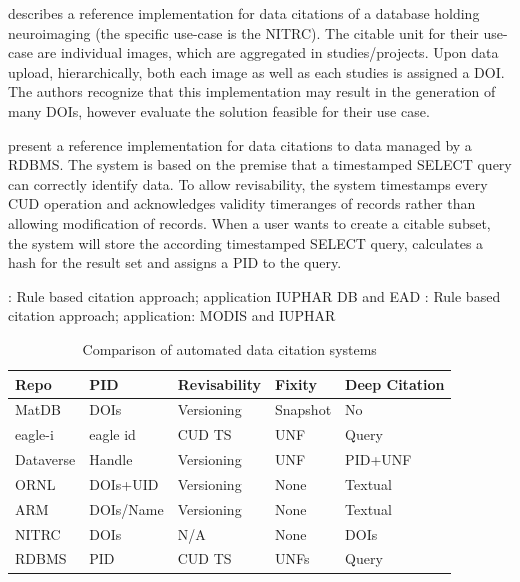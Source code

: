 \documentclass[letterpaper, twocolumn, parskip=half, fontsize=8pt, DIV=calc]{scrartcl}
\begin{document}
\cite{Honor2016} describes a reference implementation for data citations of a database holding neuroimaging (the specific use-case is the \gls{NITRC}). The citable unit for their use-case are individual images, which are aggregated in studies/projects. Upon data upload, hierarchically, both each image as well as each studies is assigned a \gls{DOI}. The authors recognize that this implementation may result in the generation of many \glspl{DOI}, however evaluate the solution feasible for their use case.

\cite{Proll2013} present a reference implementation for data citations to data managed by a \gls{RDBMS}. 
The system is based on the premise that a timestamped SELECT query can correctly identify data. To allow revisability, the system timestamps every \gls{CUD} operation and acknowledges validity timeranges of records rather than allowing modification of records. When a user wants to create a citable subset, the system will store the according timestamped SELECT query, calculates a hash for the result set and assigns a PID to the query. 


\citep{Buneman2010}: Rule based citation approach; application IUPHAR DB and EAD
\citep{Buneman2016}: Rule based citation approach; application: MODIS and IUPHAR 

\begin{table}
\caption{Comparison of automated data citation systems}
\begin{tabular}{l l l l l}
\toprule
    Repo        & PID           & Revisability   & Fixity   & Deep Citation \\\midrule
    MatDB       & DOIs          & Versioning     & Snapshot & No  \\
    eagle-i     & eagle id      & CUD TS         & UNF      & Query\\
    Dataverse   & Handle        & Versioning     & UNF      & PID+UNF \\ 
    ORNL        & DOIs+UID      & Versioning     & None     & Textual \\
    ARM         & DOIs/Name     & Versioning     & None     & Textual \\
    NITRC       & DOIs          & N/A            & None     & DOIs  \\
    RDBMS       & PID           & CUD TS         & UNFs     & Query \\
\bottomrule     
\end{tabular}
\label{tab_citcomp}
\end{table}
\end{document}
